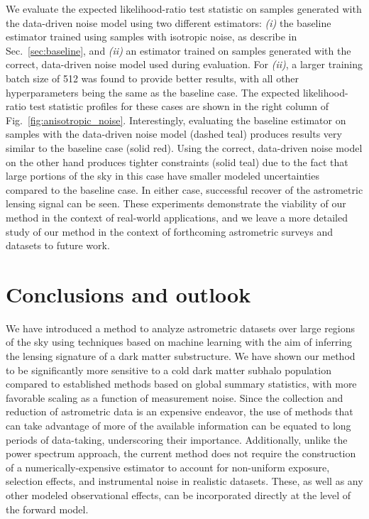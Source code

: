 \documentclass[twocolumn]{aastex631}
\begin{document}
{We evaluate the expected likelihood-ratio test statistic on samples generated with the data-driven noise model using two different estimators: \emph{(i)} the baseline estimator trained using samples with isotropic noise, as describe in Sec.~\ref{sec:baseline}, and \emph{(ii)} an estimator trained on samples generated with the correct, data-driven noise model used during evaluation. For \emph{(ii)}, a larger training batch size of 512 was found to provide better results, with all other hyperparameters being the same as the baseline case. The expected likelihood-ratio test statistic profiles for these cases are shown in the right column of Fig.~\ref{fig:anisotropic_noise}. Interestingly, evaluating the baseline estimator on samples with the data-driven noise model (dashed teal) produces results very similar to the baseline case (solid red). Using the correct, data-driven noise model on the other hand produces tighter constraints (solid teal) due to the fact that large portions of the sky in this case have smaller modeled uncertainties compared to the baseline case. In either case, successful recover of the astrometric lensing signal can be seen. These experiments demonstrate the viability of our method in the context of real-world applications, and we leave a more detailed study of our method in the context of forthcoming astrometric surveys and datasets to future work.}

\section{Conclusions and outlook}
\label{sec:conclusions}

We have introduced a method to analyze astrometric datasets over large regions of the sky using techniques based on machine learning with the aim of inferring the lensing signature of a dark matter substructure. We have shown our method to be significantly more sensitive to a cold dark matter subhalo population compared to established methods based on global summary statistics, with more favorable scaling as a function of measurement noise. Since the collection and reduction of astrometric data is an expensive endeavor, the use of methods that can take advantage of more of the available information can be equated to long periods of data-taking, underscoring their importance. Additionally, unlike the power spectrum approach, the current method does not require the construction of a numerically-expensive estimator to account for non-uniform exposure, selection effects, and instrumental noise in realistic datasets. These, as well as any other modeled observational effects, can be incorporated directly at the level of the forward model.
\end{document}
